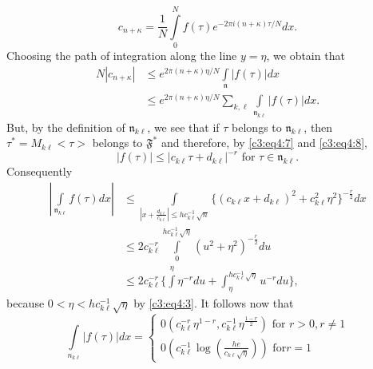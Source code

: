 $$
c_{n+\kappa} = \frac{1}{N} \int\limits^{N}_0 f(\tau) e^{-2\pi i
  (n+\kappa)\tau/N}dx. 
$$
Choosing the path of integration along the line $y=\eta$, we obtain
that 
\begin{align*}
N|c_{n+\kappa}| & \leq e^{2\pi (n+\kappa)\eta/N}
\int\limits_{\mathfrak{n}} |f(\tau)| dx\\
& \leq e^{2\pi (n+\kappa)\eta/N} \sum_{k,\ell}
\int\limits_{\mathfrak{n}_{k\ell}} |f(\tau)| dx. \tag{9}\label{c3:eq4:9}
\end{align*}
But, by the definition of $\mathfrak{n}_{k\ell}$, we see that if
$\tau$ belongs to $\mathfrak{n}_{k\ell}$, then
$\tau^{\ast}=M_{k\ell}<\tau>$ belongs to $\mathfrak{F}^{\ast}$ and
therefore, by \eqref{c3:eq4:7} and \eqref{c3:eq4:8},
$$
|f(\tau)| \leq |c_{k\ell} \tau + d_{k\ell} |^{-r} \text{ for } \tau
\in \mathfrak{n}_{k\ell}. 
$$
Consequently
\begin{align*}
|\int\limits_{\mathfrak{n}_{k\ell}} f(\tau)dx| & \leq
\int\limits_{|x+\frac{d_{k\ell}}{c_{k\ell}}|\leq h c^{-1}_{k\ell}
  \sqrt{n}} \{(c_{k\ell}x + d_{k\ell})^2 + c^2_{k\ell}
\eta^2\}^{-\frac{r}{2}} dx\\
& \leq 2c^{-r}_{k\ell} \int\limits^{hc^{-1}_{k\ell}\sqrt{\eta}}_0
(u^2+\eta^2)^{-\frac{r}{2}} du\\
& \leq 2c^{-r}_{k\ell} \{\int\limits^{\eta} \eta^{-r} du +
\int^{hc^{-1}_{k\ell}\sqrt{\eta}}_{\eta} u^{-r} du\},
\end{align*}
because \pageoriginale $0< \eta < h c^{-1}_{k\ell} \sqrt{\eta}$ by
\eqref{c3:eq4:3}. It follows now that 
\begin{equation*}
\int\limits_{n_{k\ell}} |f(\tau)| dx = 
\begin{cases}
0 (c^{-r}_{k\ell} \eta^{1-r}, c^{-1}_{k\ell} \eta^{\frac{1-r}{2}})
\text{ for } r > 0, r \neq 1\\[5pt]
0 (c^{-1}_{k\ell} \log (\frac{he}{c_{k\ell} \sqrt{\eta}})) \text{ for
} r = 1 
\end{cases} \tag{10}\label{c3:eq4:10}
\end{equation*}

